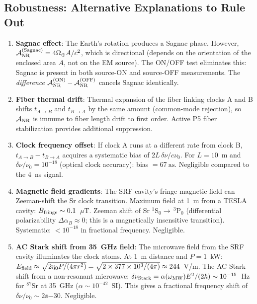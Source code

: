 \subsection{Robustness: Alternative Explanations to Rule Out}
\label{ssec:alternatives}

\begin{enumerate}[label=\textbf{A\arabic*.}, leftmargin=*, itemsep=4pt]

\item \textbf{Sagnac effect}: The Earth's rotation produces a Sagnac
phase. However, $\mathcal{A}_{\rm NR}^{(\rm Sagnac)} = 4\Omega_\oplus A/c^2$,
which is directional (depends on the orientation of the enclosed area $A$,
not on the EM source). The ON/OFF test eliminates this: Sagnac is present in
both source-ON and source-OFF measurements. The \emph{difference}
$\mathcal{A}_{\rm NR}^{(\rm ON)} - \mathcal{A}_{\rm NR}^{(\rm OFF)}$
cancels Sagnac identically.

\item \textbf{Fiber thermal drift}: Thermal expansion of the fiber linking
clocks A and B shifts $t_{A\to B}$ and $t_{B\to A}$ by the same amount
(common-mode rejection), so $\mathcal{A}_{\rm NR}$ is immune to fiber
length drift to first order. Active P5 fiber stabilization provides
additional suppression.

\item \textbf{Clock frequency offset}: If clock A runs at a different rate
from clock B, $t_{A\to B} - t_{B\to A}$ acquires a systematic bias of
$2L\,\delta\nu/c\nu_0$. For $L = 10$~m and $\delta\nu/\nu_0 = 10^{-18}$
(optical clock accuracy): bias $= 67~\text{as}$. Negligible compared to
the 4~ns signal.

\item \textbf{Magnetic field gradients}: The SRF cavity's fringe magnetic
field can Zeeman-shift the Sr clock transition. Maximum field at 1~m from
a TESLA cavity: $B_{\rm fringe} \sim 0.1$~$\mu$T. Zeeman shift of Sr
$^1$S$_0 \to \, ^3$P$_0$ (differential polarizability $\Delta\alpha_B
\approx 0$; this is a magnetically insensitive transition). Systematic:
$< 10^{-18}$ in fractional frequency. Negligible.

\item \textbf{AC Stark shift from 35~GHz field}: The microwave field from
the SRF cavity illuminates the clock atoms. At 1~m distance and $P = 1$~kW:
$E_{\rm field} \approx \sqrt{2\eta_0 P/(4\pi r^2)} = \sqrt{2\times377\times10^3/(4\pi)}
\approx 244$~V/m. The AC Stark shift from a non-resonant microwave:
$\delta\nu_{\rm Stark} = \alpha(\omega_{\rm MW})E^2/(2\hbar) \sim 10^{-15}$~Hz
for $^{87}$Sr at 35~GHz ($\alpha \sim 10^{-42}$~SI). This gives a fractional
frequency shift of $\delta\nu/\nu_0 \sim 2\ee{-30}$. Negligible.

\end{enumerate}

